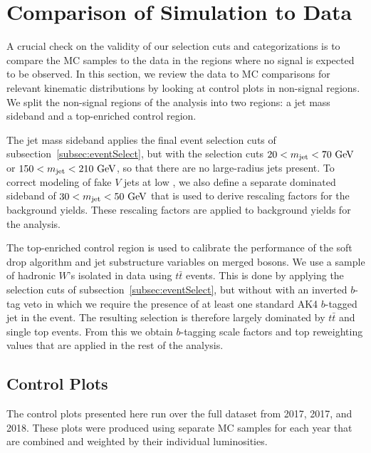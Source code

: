 
\section{Comparison of Simulation to Data}
\label{sec:comp}

A crucial check on the validity of our selection cuts and categorizations is to compare the MC samples to the data in the regions where no signal is expected to be observed.
In this section, we review the data to MC comparisons for relevant kinematic distributions by looking at control plots in non-signal regions.
We split the non-signal regions of the analysis into two regions: a jet mass sideband and a top-enriched control region.

The jet mass sideband applies the final event selection cuts of subsection~\ref{subsec:eventSelect}, but with the \MJ selection cuts $20<\MJ<70\unit{GeV}$ or $150<\MJ<210\unit{GeV}$, so that there are no \Vhad large-radius jets present.
To correct modeling of fake $V$ jets at low \pt, we also define a separate \Wjets dominated sideband of $30<\MJ<50\unit{GeV}$ that is used to derive rescaling factors for the \Wjets background yields.
These rescaling factors are applied to \Wjets background yields for the analysis.

The top-enriched control region is used to calibrate the performance of the soft drop algorithm and jet substructure variables on merged bosons.
We use a sample of hadronic $W$'s isolated in data using $t\bar{t}$ events.
This is done by applying the selection cuts of subsection~\ref{subsec:eventSelect}, but without with an inverted $b$-tag veto in which we require the presence of at least one standard AK4 $b$-tagged jet in the event.
The resulting selection is therefore largely dominated by $t\bar{t}$ and single top events.
From this we obtain $b$-tagging scale factors and top \pt reweighting values that are applied in the rest of the analysis.

\subsection{Control Plots}

The control plots presented here run over the full dataset from 2017, 2017, and 2018.
These plots were produced using separate MC samples for each year that are combined and weighted by their individual luminosities.


